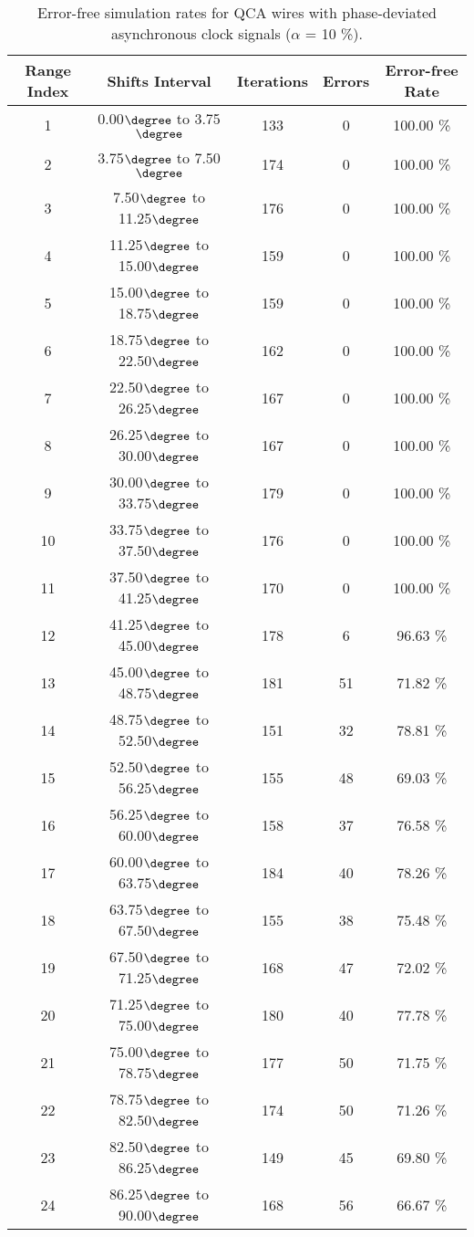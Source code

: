 \flushleft
\begin{table}[h]
\begin{center}
\caption{Error-free simulation rates for QCA wires with phase-deviated asynchronous clock signals ($\alpha$ = 10 \%).}
\begin{tabular}{|c|c|c|c|c|}
\hline
\textbf{Range Index} & \textbf{Shifts Interval} & \textbf{Iterations} & \textbf{Errors} & \textbf{Error-free Rate} \\
\hline
1  &  0.00$\degree$ to  3.75$\degree$ & 133 &  0 & 100.00 \% \\
\hline
2  &  3.75$\degree$ to  7.50$\degree$ & 174 &  0 & 100.00 \% \\
\hline
3  &  7.50$\degree$ to 11.25$\degree$ & 176 &  0 & 100.00 \% \\
\hline
4  & 11.25$\degree$ to 15.00$\degree$ & 159 &  0 & 100.00 \% \\
\hline
5  & 15.00$\degree$ to 18.75$\degree$ & 159 &  0 & 100.00 \% \\
\hline
6  & 18.75$\degree$ to 22.50$\degree$ & 162 &  0 & 100.00 \% \\
\hline
7  & 22.50$\degree$ to 26.25$\degree$ & 167 &  0 & 100.00 \% \\
\hline
8  & 26.25$\degree$ to 30.00$\degree$ & 167 &  0 & 100.00 \% \\
\hline
9  & 30.00$\degree$ to 33.75$\degree$ & 179 &  0 & 100.00 \% \\
\hline
10 & 33.75$\degree$ to 37.50$\degree$ & 176 &  0 & 100.00 \% \\
\hline
11 & 37.50$\degree$ to 41.25$\degree$ & 170 &  0 & 100.00 \% \\
\hline
12 & 41.25$\degree$ to 45.00$\degree$ & 178 &  6 &  96.63 \% \\
\hline
13 & 45.00$\degree$ to 48.75$\degree$ & 181 & 51 &  71.82 \% \\
\hline
14 & 48.75$\degree$ to 52.50$\degree$ & 151 & 32 &  78.81 \% \\
\hline
15 & 52.50$\degree$ to 56.25$\degree$ & 155 & 48 &  69.03 \% \\
\hline
16 & 56.25$\degree$ to 60.00$\degree$ & 158 & 37 &  76.58 \% \\
\hline
17 & 60.00$\degree$ to 63.75$\degree$ & 184 & 40 &  78.26 \% \\
\hline
18 & 63.75$\degree$ to 67.50$\degree$ & 155 & 38 &  75.48 \% \\
\hline
19 & 67.50$\degree$ to 71.25$\degree$ & 168 & 47 &  72.02 \% \\
\hline
20 & 71.25$\degree$ to 75.00$\degree$ & 180 & 40 &  77.78 \% \\
\hline
21 & 75.00$\degree$ to 78.75$\degree$ & 177 & 50 &  71.75 \% \\
\hline
22 & 78.75$\degree$ to 82.50$\degree$ & 174 & 50 &  71.26 \% \\
\hline
23 & 82.50$\degree$ to 86.25$\degree$ & 149 & 45 &  69.80 \% \\
\hline
24 & 86.25$\degree$ to 90.00$\degree$ & 168 & 56 &  66.67 \% \\
\hline


\end{tabular}
\end{center}
\end{table}
